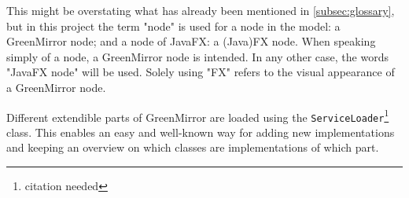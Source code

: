 \documentclass[a4paper]{article}
\begin{document}
	This might be overstating what has already been mentioned in \cref{subsec:glossary}, but in this project the term "node" is used for a node in the model: a GreenMirror node; and a node of JavaFX: a (Java)FX node. When speaking simply of a node, a GreenMirror node is intended. In any other case, the words "JavaFX node" will be used. Solely using "FX" refers to the visual appearance of a GreenMirror node.
	
	Different extendible parts of GreenMirror are loaded using the \lstinline{ServiceLoader}\footnote{citation needed} class. This enables an easy and well-known way for adding new implementations and keeping an overview on which classes are implementations of which part.
	
	

	
	
	
\end{document}
